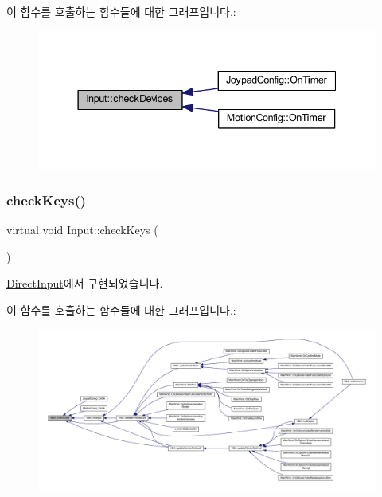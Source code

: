 이 함수를 호출하는 함수들에 대한 그래프입니다.\+:
\nopagebreak
\begin{figure}[H]
\begin{center}
\leavevmode
\includegraphics[width=337pt]{class_input_a7a6ef57ff2638f545380618b2d3fdf9d_icgraph}
\end{center}
\end{figure}
\mbox{\label{class_input_a91418a5762e6e50aa4f59e4ce92d2dfa}} 
\subsubsection{\texorpdfstring{check\+Keys()}{checkKeys()}}
{\footnotesize\ttfamily virtual void Input\+::check\+Keys (\begin{DoxyParamCaption}{ }\end{DoxyParamCaption})\hspace{0.3cm}{\ttfamily [pure virtual]}}



\mbox{\hyperlink{class_direct_input_acecffb99132b93e827373a3683ce342b}{Direct\+Input}}에서 구현되었습니다.

이 함수를 호출하는 함수들에 대한 그래프입니다.\+:
\nopagebreak
\begin{figure}[H]
\begin{center}
\leavevmode
\includegraphics[width=350pt]{class_input_a91418a5762e6e50aa4f59e4ce92d2dfa_icgraph}
\end{center}
\end{figure}
\mbox{\label{class_input_aac8f25a1a6a7e0bd54e5d50b9b774844}} 
